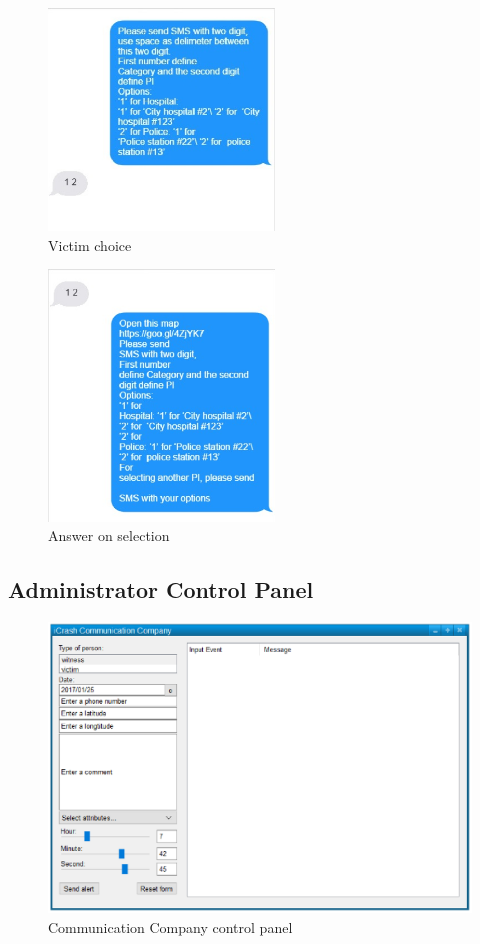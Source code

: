 \begin{figure}
  \centering
    \includegraphics[width=6cm]{images/mockups/feature3-PI/UserSelectedOption.eps}
  \caption{Victim choice}
  \label{fig:Victimchoice}
\end{figure}  


\begin{figure}
  \centering
    \includegraphics[width=6cm]{images/mockups/feature3-PI/iCrashRequest.eps}
  \caption{Answer on selection}
  \label{fig:Answeronselection}
\end{figure}

\subsection{Administrator Control Panel}

\begin{figure}
  \centering
    \includegraphics[width=12cm]{images/mockups/feature2-access-rights/CommunicationCompany.eps}
  \caption{Communication Company control panel}
  \label{fig:CommunicationCompanyControlPanel}
\end{figure}
